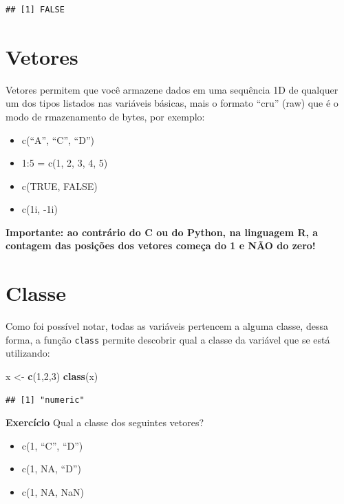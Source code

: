 \documentclass[]{book}
\newenvironment{Shaded}{\begin{snugshade}}{\end{snugshade}}
\newcommand{\KeywordTok}[1]{\textcolor[rgb]{0.13,0.29,0.53}{\textbf{#1}}}
\newcommand{\DecValTok}[1]{\textcolor[rgb]{0.00,0.00,0.81}{#1}}
\newcommand{\StringTok}[1]{\textcolor[rgb]{0.31,0.60,0.02}{#1}}
\newcommand{\NormalTok}[1]{#1}
\providecommand{\tightlist}{%
  \setlength{\itemsep}{0pt}\setlength{\parskip}{0pt}}
\theoremstyle{definition}
\theoremstyle{definition}
\theoremstyle{definition}
\theoremstyle{remark}
\begin{document}
\begin{verbatim}
## [1] FALSE
\end{verbatim}

\section{Vetores}\label{vetores}

Vetores permitem que você armazene dados em uma sequência 1D de qualquer
um dos tipos listados nas variáveis básicas, mais o formato ``cru''
(raw) que é o modo de rmazenamento de bytes, por exemplo:

\begin{itemize}
\tightlist
\item
  c(``A'', ``C'', ``D'')
\item
  1:5 = c(1, 2, 3, 4, 5)
\item
  c(TRUE, FALSE)
\item
  c(1i, -1i)
\end{itemize}

\textbf{Importante: ao contrário do C ou do Python, na linguagem R, a
contagem das posições dos vetores começa do 1 e NÃO do zero!}

\section{Classe}\label{classe}

Como foi possível notar, todas as variáveis pertencem a alguma classe,
dessa forma, a função \texttt{class} permite descobrir qual a classe da
variável que se está utilizando:

\begin{Shaded}
\begin{Highlighting}[]
\NormalTok{x <-}\StringTok{ }\KeywordTok{c}\NormalTok{(}\DecValTok{1}\NormalTok{,}\DecValTok{2}\NormalTok{,}\DecValTok{3}\NormalTok{)}
\KeywordTok{class}\NormalTok{(x)}
\end{Highlighting}
\end{Shaded}

\begin{verbatim}
## [1] "numeric"
\end{verbatim}

\textbf{Exercício} Qual a classe dos seguintes vetores?

\begin{itemize}
\tightlist
\item
  c(1, ``C'', ``D'')
\item
  c(1, NA, ``D'')
\item
  c(1, NA, NaN)
\end{itemize}
\end{document}
